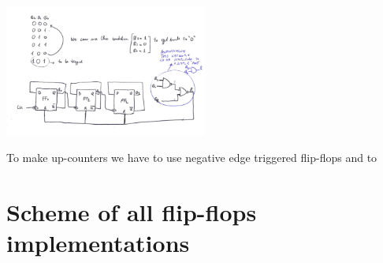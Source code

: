 \centering
\includegraphics[width=0.5\textwidth]{C10_24.png}\\
\raggedright

To make up-counters we have to use negative edge triggered flip-flops and to 

\section{Scheme of all flip-flops implementations}


